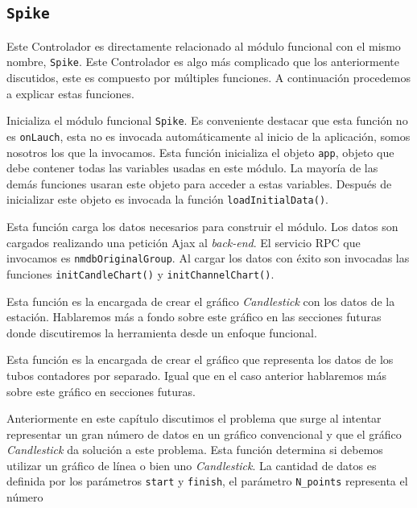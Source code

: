 	\subsection{\texttt{Spike}}
		Este Controlador es directamente relacionado al módulo funcional con el mismo nombre, \texttt{Spike}. Este Controlador es algo más
		complicado que los anteriormente discutidos, este es compuesto por múltiples funciones. A continuación procedemos a explicar estas
		funciones.
		\begin{description}[style=unboxed,leftmargin=0cm]
			\item[\texttt{Launch()}] Inicializa el módulo funcional \texttt{Spike}. Es conveniente destacar que esta función no es
			  \texttt{onLauch}, esta no es invocada automáticamente al inicio de la aplicación, somos nosotros los que la invocamos. Esta
			  función inicializa el objeto \texttt{app}, objeto que debe contener todas las variables usadas en este módulo. La mayoría de
			  las demás funciones usaran este objeto para acceder a estas variables. Después de inicializar este objeto es invocada la
			  función \texttt{loadInitialData()}.
			\item[\texttt{loadInitialData()}] Esta función carga los datos necesarios para construir el módulo. Los datos son cargados
			  realizando una petición Ajax al \emph{back-end}. El servicio RPC que invocamos es \texttt{nmdbOriginalGroup}. Al cargar los
			  datos con éxito son invocadas las funciones \texttt{initCandleChart()} y \texttt{initChannelChart()}. 
			\item[\texttt{initCandleChart()}] Esta función es la encargada de crear el gráfico \emph{Candlestick} con los datos de la
			  estación. Hablaremos más a fondo sobre este gráfico en las secciones futuras donde discutiremos la herramienta desde un
			  enfoque funcional.
			\item[\texttt{initChannelChart()}] Esta función es la encargada de crear el gráfico que representa los datos de los tubos
			  contadores por separado. Igual que en el caso anterior hablaremos más sobre este gráfico en secciones futuras.
			\item[\texttt{LineOrOhcl(start, finish, N\_points)}] Anteriormente en este capítulo discutimos el problema que surge al
			  intentar representar un gran número de datos en un gráfico convencional y que el gráfico \emph{Candlestick} da solución a
			  este problema. Esta función determina si debemos utilizar un gráfico de línea o bien uno \emph{Candlestick}. La cantidad de
			  datos es definida por los parámetros \texttt{start} y \texttt{finish}, el parámetro \texttt{N\_points} representa el número

\end{description}
